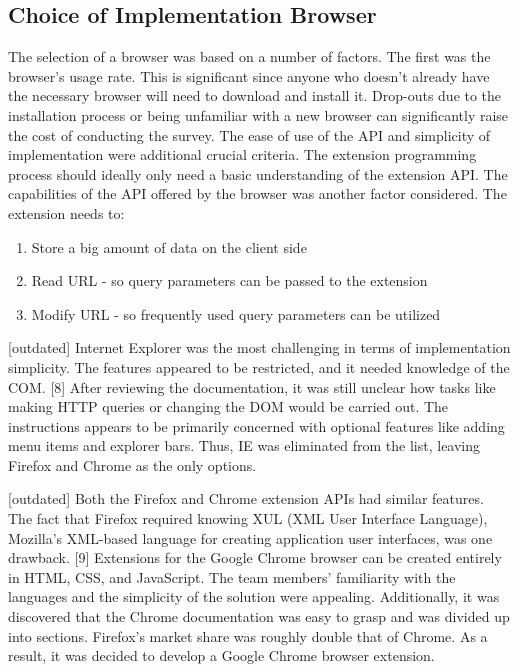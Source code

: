 \subsection{Choice of Implementation Browser}
The selection of a browser was based on a number of factors. The first was the browser's usage rate. This is significant since anyone who doesn't already have the necessary browser will need to download and install it. Drop-outs due to the installation process or being unfamiliar with a new browser can significantly raise the cost of conducting the survey. The ease of use of the API and simplicity of implementation were additional crucial criteria. The extension programming process should ideally only need a basic understanding of the extension API. The capabilities of the API offered by the browser was another factor considered. The extension needs to:

\begin{enumerate}
  \item Store a big amount of data on the client side
  \item Read URL - so query parameters can be passed to the extension
  \item Modify URL - so frequently used query parameters can be utilized
\end{enumerate}

[outdated] Internet Explorer was the most challenging in terms of implementation simplicity. The features appeared to be restricted, and it needed knowledge of the COM. [8] After reviewing the documentation, it was still unclear how tasks like making HTTP queries or changing the DOM would be carried out. The instructions appears to be primarily concerned with optional features like adding menu items and explorer bars. Thus, IE was eliminated from the list, leaving Firefox and Chrome as the only options.

  [outdated] Both the Firefox and Chrome extension APIs had similar features. The fact that Firefox required knowing XUL (XML User Interface Language), Mozilla's XML-based language for creating application user interfaces, was one drawback. [9] Extensions for the Google Chrome browser can be created entirely in HTML, CSS, and JavaScript. The team members' familiarity with the languages and the simplicity of the solution were appealing. Additionally, it was discovered that the Chrome documentation was easy to grasp and was divided up into sections. Firefox's market share was roughly double that of Chrome. As a result, it was decided to develop a Google Chrome browser extension.


